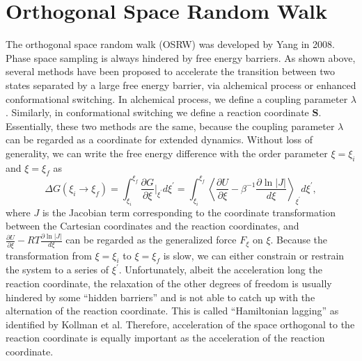 \section{Orthogonal Space Random Walk\label{Sec:ES:OSRW}}
The orthogonal space random walk (OSRW) was developed by Yang in 2008.\cite{ZhengPNAS2008}
Phase space sampling is always hindered by free energy barriers. As shown above, several methods have been proposed to accelerate the transition between two states separated by a large free energy barrier, via alchemical process or enhanced conformational switching. In alchemical process, we define a coupling parameter $\lambda$. Similarly, in conformational switching we define a reaction coordinate $\mathbf{S}$. Essentially, these two methods are the same, because the coupling parameter $\lambda$ can be regarded as a coordinate for extended dynamics. Without loss of generality, we can write the free energy difference with the order parameter $\xi=\xi_i$ and $\xi=\xi_f$ as
\begin{equation}
	\Delta G(\xi_i \rightarrow \xi_f)=\int_{\xi_i}^{\xi_f}\frac{\partial G}{\partial \xi}\bigg\rvert_{\xi^\prime} d\xi^\prime=\int_{\xi_i}^{\xi_f}\left<\frac{\partial U}{\partial \xi}-\beta^{-1}\frac{\partial \ln{|J|}}{d\xi}\right>_{\xi^\prime}d\xi^\prime,
\end{equation}
where $J$ is the Jacobian term corresponding to the coordinate transformation between the Cartesian coordinates and the reaction coordinates, and $\frac{\partial U}{\partial \xi}-RT\frac{\partial \ln{|J|}}{d\xi}$ can be regarded as the generalized force $F_\xi$ on $\xi$. Because the transformation from $\xi=\xi_i$ to $\xi=\xi_f$ is slow, we can either constrain or restrain the system to a series of $\xi^\prime$. Unfortunately, albeit the acceleration long the reaction coordinate, the relaxation of the other degrees of freedom is usually hindered by some ``hidden barriers'' and is not able to catch up with the alternation of the reaction coordinate. This is called ``Hamiltonian lagging'' as identified by Kollman et al.\cite{PearlmanJCP1989} Therefore, acceleration of the space orthogonal to the reaction coordinate is equally important as the acceleration of the reaction coordinate.

